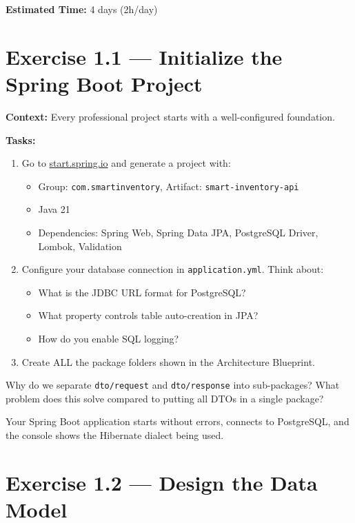 \documentclass[12pt,a4paper]{report}
\begin{document}
\textbf{Estimated Time:} 4 days (2h/day)

\section{Exercise 1.1 --- Initialize the Spring Boot Project}

\textbf{Context:} Every professional project starts with a well-configured foundation.

\textbf{Tasks:}
\begin{enumerate}
    \item Go to \href{https://start.spring.io}{start.spring.io} and generate a project with:
    \begin{itemize}
        \item Group: \texttt{com.smartinventory}, Artifact: \texttt{smart-inventory-api}
        \item Java 21
        \item Dependencies: Spring Web, Spring Data JPA, PostgreSQL Driver, Lombok, Validation
    \end{itemize}
    \item Configure your database connection in \texttt{application.yml}. Think about:
    \begin{itemize}
        \item What is the JDBC URL format for PostgreSQL?
        \item What property controls table auto-creation in JPA?
        \item How do you enable SQL logging?
    \end{itemize}
    \item Create ALL the package folders shown in the Architecture Blueprint.
\end{enumerate}

\begin{thinkbox}
Why do we separate \texttt{dto/request} and \texttt{dto/response} into sub-packages? What problem does this solve compared to putting all DTOs in a single package?
\end{thinkbox}

\begin{checkpoint}
Your Spring Boot application starts without errors, connects to PostgreSQL, and the console shows the Hibernate dialect being used.
\end{checkpoint}

\section{Exercise 1.2 --- Design the Data Model}
\end{document}
